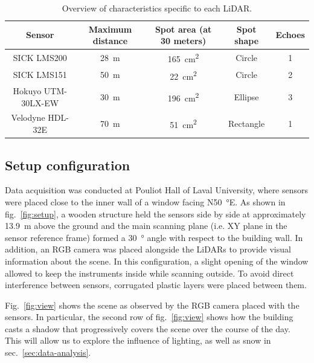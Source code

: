 \begin{table}[htbp]
    \centering
    \begin{tabular}{|c|c|c|c|c|}
        \hline
        \textbf{Sensor}     & \textbf{Maximum distance}  & \textbf{Spot area (at 30 meters)}  & \textbf{Spot shape} & \textbf{Echoes} \\\hline
        SICK LMS200         & \SI{28}{\meter}            & \SI{165}{\centi\meter\squared}     & Circle              & 1               \\\hline
        SICK LMS151         & \SI{50}{\meter}            & \SI{22}{\centi\meter\squared}      & Circle              & 2               \\\hline
        Hokuyo UTM-30LX-EW  & \SI{30}{\meter}            & \SI{196}{\centi\meter\squared}     & Ellipse             & 3               \\\hline
        Velodyne HDL-32E    & \SI{70}{\meter}            & \SI{51}{\centi\meter\squared}      & Rectangle           & 1               \\\hline
    \end{tabular}
    \caption{Overview of characteristics specific to each LiDAR.}
    \label{tab:lidars}
\end{table}

\subsection{Setup configuration}

Data acquisition was conducted at Pouliot Hall of Laval University, where sensors were placed close to the inner wall of a window facing N\SI{50}{\degree}E. As shown in fig.~\ref{fig:setup}, a wooden structure held the sensors side by side at approximately \SI{13.9}{\meter} above the ground and the main scanning plane (i.e. XY plane in the sensor reference frame) formed a \SI{30}{\degree} angle with respect to the building wall. In addition, an RGB camera was placed alongside the LiDARs to provide visual information about the scene. In this configuration, a slight opening of the window allowed to keep the instruments inside while scanning outside. To avoid direct interference between sensors, corrugated plastic layers were placed between them.

Fig.~\ref{fig:view} shows the scene as observed by the RGB camera placed with the sensors. In particular, the second row of fig.~\ref{fig:view} shows how the building casts a shadow that progressively covers the scene over the course of the day. This will allow us to explore the influence of lighting, as well as snow in sec.~\ref{sec:data-analysis}.

